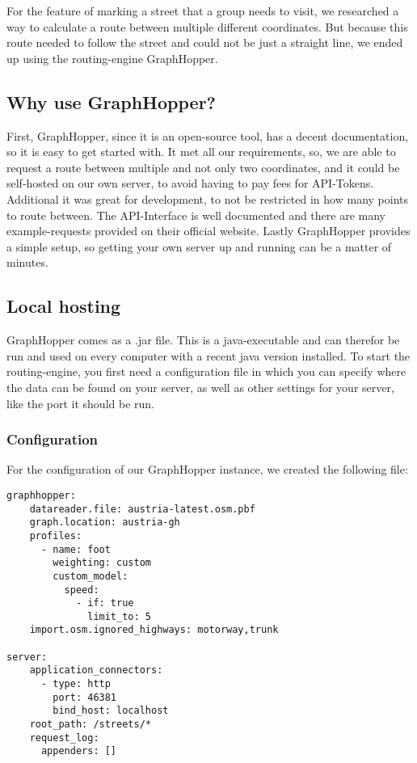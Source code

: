 \Author{\daAuthorTwo}

For the feature of marking a street that a group needs to visit, we researched a way to calculate a route between multiple different coordinates. But because this route needed to follow the street and could not be just a straight line, we ended up using the routing-engine GraphHopper. 

\subsection{Why use GraphHopper?}

First, GraphHopper, since it is an open-source tool, has a decent documentation, so it is easy to get started with. It met all our requirements, so, we are able to request a route between multiple and not only two coordinates, and it could be self-hosted on our own server, to avoid having to pay fees for API-Tokens. Additional it was great for development, to not be restricted in how many points to route between. The API-Interface is well documented and there are many example-requests provided on their official website. Lastly GraphHopper provides a simple setup, so getting your own server up and running can be a matter of minutes.

\blankLine

\subsection{Local hosting}

GraphHopper comes as a .jar file. This is a java-executable and can therefor be run and used on every computer with a recent java version installed. To start the routing-engine, you first need a configuration file in which you can specify where the data can be found on your server, as well as other settings for your server, like the port it should be run.

\blankLine

\subsubsection{Configuration}

For the configuration of our GraphHopper instance, we created the following file: 

\lstset{style=config, caption=GraphHopper configuration file (config.yml)}
\begin{lstlisting}
graphhopper:
    datareader.file: austria-latest.osm.pbf
    graph.location: austria-gh
    profiles:
      - name: foot
        weighting: custom
        custom_model:
          speed:
            - if: true
              limit_to: 5
    import.osm.ignored_highways: motorway,trunk

server:
    application_connectors:
      - type: http
        port: 46381
        bind_host: localhost
    root_path: /streets/*
    request_log:
      appenders: []
\end{lstlisting}


